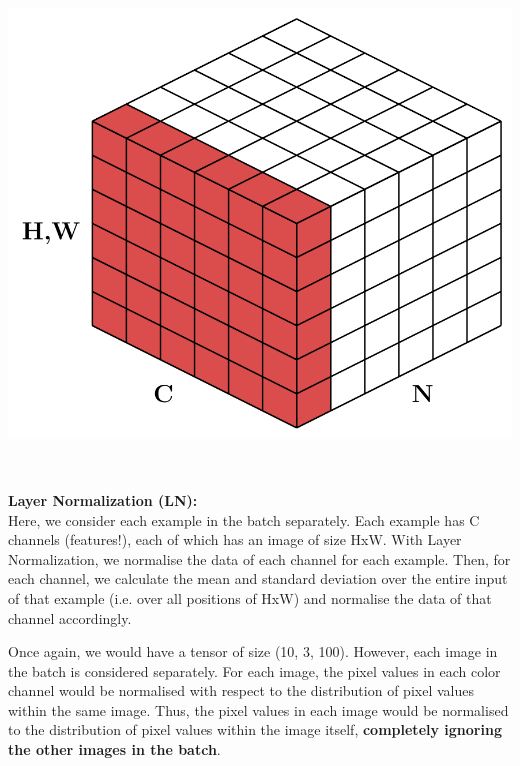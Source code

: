 \begin{minipage}{0.55\textwidth}
\includegraphics[width=\textwidth]{tikz/chapter3 - Layer Norm.pdf}
\end{minipage}
\begin{minipage}{0.05\textwidth}
\ 
\end{minipage}
\begin{minipage}{0.4\textwidth}
\textbf{\textcolor{myred!70}{Layer Normalization (LN):}} \\

Here, we consider each example in the batch separately. Each example has C channels (features!), each of which has an image of size HxW. With Layer Normalization, we normalise the data of each channel for each example. Then, for each channel, we calculate the mean and standard deviation over the entire input of that example (i.e. over all positions of HxW) and normalise the data of that channel accordingly.
\end{minipage}

Once again, we would have a tensor of size (10, 3, 100).
However, each image in the batch is considered separately. For each image, the pixel values in each color channel would be normalised with respect to the distribution of pixel values within the same image.
Thus, the pixel values in each image would be normalised to the distribution of pixel values within the image itself, \textbf{completely ignoring the other images in the batch}.


